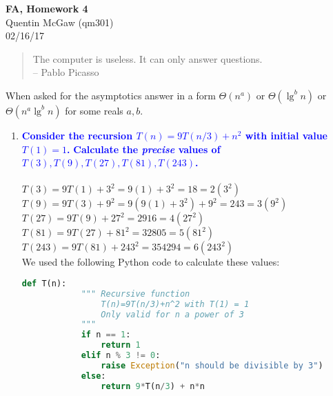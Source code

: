 \documentclass[11pt]{article}
\begin{document}
\begin{center} {\Large\bf FA, Homework 4}  \\ Quentin McGaw (qm301) \\ 02/16/17

\end{center}

\begin{quote}
The computer is useless. It can only answer questions.  \\ -- Pablo Picasso
\end{quote}

When asked for the asymptotics answer in a form $\Theta(n^a)$ or
$\Theta(\lg^bn)$ or $\Theta(n^a\lg^bn)$ for some reals $a,b$.

\begin{enumerate}
\item  \textbf{\textcolor{blue}{Consider the recursion
$T(n)=9T(n/3) + n^2$ with initial value $T(1)=1$.}}
    \textbf{\textcolor{blue}{Calculate the {\em precise} values of $T(3),T(9),T(27),T(81),T(243)$.}}
        \\\\ $T(3) = 9T(1) + 3^2 = 9(1) + 3^2 = 18 = 2(3^2)$
        \\ $T(9) = 9T(3) + 9^2 = 9(9(1) + 3^2) + 9^2 = 243 = 3(9^2)$
        \\ $T(27) = 9T(9) + 27^2 = 2916 = 4(27^2)$
        \\ $T(81) = 9T(27) + 81^2 = 32805 = 5(81^2)$
        \\ $T(243) = 9T(81) + 243^2 = 354294 = 6(243^2)$
        \\ We used the following Python code to calculate these values:
        \begin{lstlisting}[language=Python]
        def T(n):
            """ Recursive function 
                T(n)=9T(n/3)+n^2 with T(1) = 1
                Only valid for n a power of 3
            """
            if n == 1:
                return 1
            elif n % 3 != 0:
                raise Exception("n should be divisible by 3")
            else:
                return 9*T(n/3) + n*n
        

\end{lstlisting}
\end{enumerate}
\end{document}
